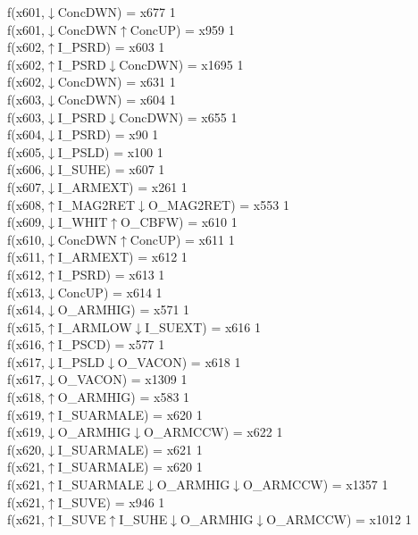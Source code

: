 f(x601,$\downarrow$ConcDWN) = x677 {1} \\
f(x601,$\downarrow$ConcDWN$\uparrow$ConcUP) = x959 {1} \\
f(x602,$\uparrow$I\_PSRD) = x603 {1} \\
f(x602,$\uparrow$I\_PSRD$\downarrow$ConcDWN) = x1695 {1} \\
f(x602,$\downarrow$ConcDWN) = x631 {1} \\
f(x603,$\downarrow$ConcDWN) = x604 {1} \\
f(x603,$\downarrow$I\_PSRD$\downarrow$ConcDWN) = x655 {1} \\
f(x604,$\downarrow$I\_PSRD) = x90 {1} \\
f(x605,$\downarrow$I\_PSLD) = x100 {1} \\
f(x606,$\downarrow$I\_SUHE) = x607 {1} \\
f(x607,$\downarrow$I\_ARMEXT) = x261 {1} \\
f(x608,$\uparrow$I\_MAG2RET$\downarrow$O\_MAG2RET) = x553 {1} \\
f(x609,$\downarrow$I\_WHIT$\uparrow$O\_CBFW) = x610 {1} \\
f(x610,$\downarrow$ConcDWN$\uparrow$ConcUP) = x611 {1} \\
f(x611,$\uparrow$I\_ARMEXT) = x612 {1} \\
f(x612,$\uparrow$I\_PSRD) = x613 {1} \\
f(x613,$\downarrow$ConcUP) = x614 {1} \\
f(x614,$\downarrow$O\_ARMHIG) = x571 {1} \\
f(x615,$\uparrow$I\_ARMLOW$\downarrow$I\_SUEXT) = x616 {1} \\
f(x616,$\uparrow$I\_PSCD) = x577 {1} \\
f(x617,$\downarrow$I\_PSLD$\downarrow$O\_VACON) = x618 {1} \\
f(x617,$\downarrow$O\_VACON) = x1309 {1} \\
f(x618,$\uparrow$O\_ARMHIG) = x583 {1} \\
f(x619,$\uparrow$I\_SUARMALE) = x620 {1} \\
f(x619,$\downarrow$O\_ARMHIG$\downarrow$O\_ARMCCW) = x622 {1} \\
f(x620,$\downarrow$I\_SUARMALE) = x621 {1} \\
f(x621,$\uparrow$I\_SUARMALE) = x620 {1} \\
f(x621,$\uparrow$I\_SUARMALE$\downarrow$O\_ARMHIG$\downarrow$O\_ARMCCW) = x1357 {1} \\
f(x621,$\uparrow$I\_SUVE) = x946 {1} \\
f(x621,$\uparrow$I\_SUVE$\uparrow$I\_SUHE$\downarrow$O\_ARMHIG$\downarrow$O\_ARMCCW) = x1012 {1} \\
